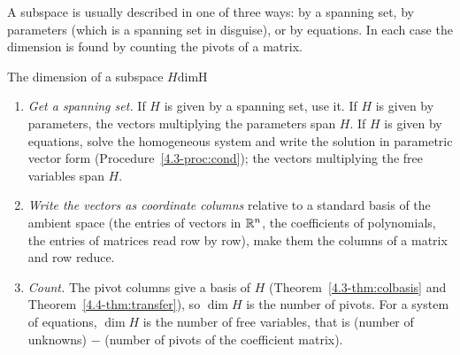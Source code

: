 \documentclass[11pt]{article}
\begin{document}
A subspace is usually described in one of three ways: by a spanning set, by parameters (which is a spanning set in disguise), or by equations. In each case the dimension is found by counting the pivots of a matrix.

\begin{proc}{The dimension of a subspace $H$}{dimH}
\begin{enumerate}
  \item \emph{Get a spanning set.} If $H$ is given by a spanning set, use it. If $H$ is given by parameters, the vectors multiplying the parameters span $H$. If $H$ is given by equations, solve the homogeneous system and write the solution in parametric vector form (Procedure~\ref{4.3-proc:cond}); the vectors multiplying the free variables span $H$.
  \item \emph{Write the vectors as coordinate columns} relative to a standard basis of the ambient space (the entries of vectors in $\mathbb{R}^n$, the coefficients of polynomials, the entries of matrices read row by row), make them the columns of a matrix and row reduce.
  \item \emph{Count.} The pivot columns give a basis of $H$ (Theorem~\ref{4.3-thm:colbasis} and Theorem~\ref{4.4-thm:transfer}), so $\dim H$ is the number of pivots. For a system of equations, $\dim H$ is the number of free variables, that is (number of unknowns) $-$ (number of pivots of the coefficient matrix).
\end{enumerate}
\end{proc}
\end{document}
